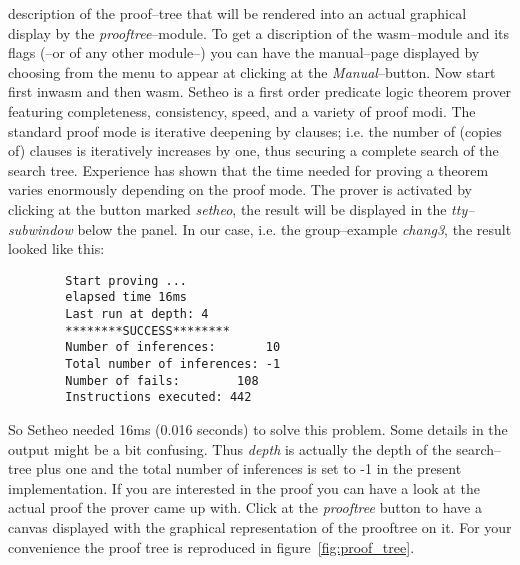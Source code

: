 description of the proof--tree that will be rendered into an actual graphical display by the {\it prooftree\/}--module.
To get a discription of the wasm--module and its flags (--or of any other module--) you can have
the manual--page displayed by choosing from the menu to appear at clicking at the {\it Manual\/}--button.
Now start first inwasm and then wasm.
Setheo is a first order predicate logic theorem prover featuring completeness, consistency, speed,
and a variety of proof modi. The standard proof mode is iterative deepening by clauses; i.e. the
number of (copies of) clauses is iteratively increases by one, thus securing a complete search of the search tree.
Experience has shown that the time needed for proving a theorem varies enormously depending on the
proof mode.
The prover is activated by clicking at the button marked {\it setheo\/}, the result will be displayed in the
{\it tty--subwindow\/} below the panel. In our case, i.e. the group--example {\it chang3\/}, the result looked like this:

\begin{verbatim}
        Start proving ...
        elapsed time 16ms
        Last run at depth: 4
        ********SUCCESS********
        Number of inferences:		10
        Total number of inferences:	-1
        Number of fails:		108
        Instructions executed: 442
\end{verbatim}

So Setheo needed 16ms (0.016 seconds) to solve this problem. Some details in the output might be a
bit confusing. Thus {\it depth\/} is actually the depth of the search--tree plus one and the total number of
inferences is set to -1 in the present implementation.
If you are interested in the proof you can have a look at the actual proof the prover came up with.
Click at the {\it prooftree\/} button to have a canvas displayed with the graphical representation of the
prooftree on it.
For your convenience the proof tree is reproduced in figure~\ref{fig:proof_tree}.
%


